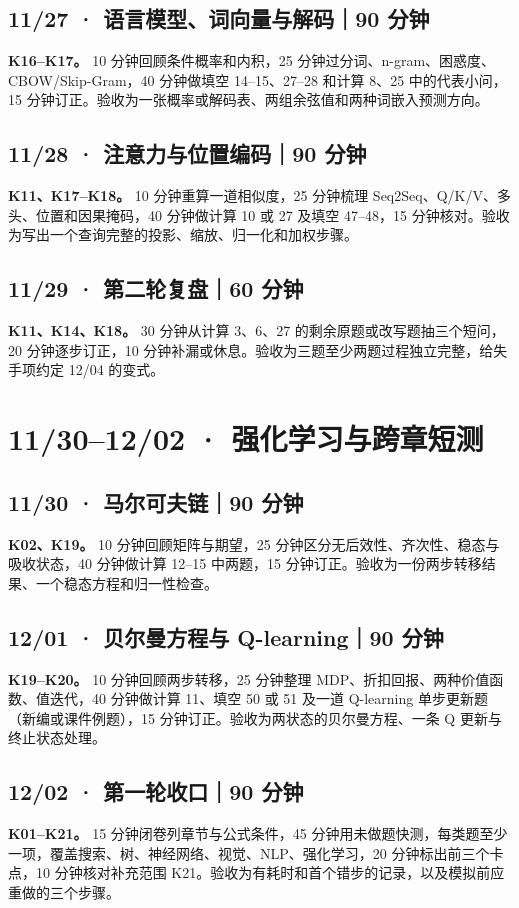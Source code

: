 \documentclass[UTF8,a4paper,11pt]{ctexart}
\begin{document}
\subsection{11/27 · 语言模型、词向量与解码｜90 分钟}
\textbf{K16–K17。} 10 分钟回顾条件概率和内积，25 分钟过分词、n-gram、困惑度、CBOW/Skip-Gram，40 分钟做填空 14–15、27–28 和计算 8、25 中的代表小问，15 分钟订正。验收为一张概率或解码表、两组余弦值和两种词嵌入预测方向。

\subsection{11/28 · 注意力与位置编码｜90 分钟}
\textbf{K11、K17–K18。} 10 分钟重算一道相似度，25 分钟梳理 Seq2Seq、Q/K/V、多头、位置和因果掩码，40 分钟做计算 10 或 27 及填空 47–48，15 分钟核对。验收为写出一个查询完整的投影、缩放、归一化和加权步骤。

\subsection{11/29 · 第二轮复盘｜60 分钟}
\textbf{K11、K14、K18。} 30 分钟从计算 3、6、27 的剩余原题或改写题抽三个短问，20 分钟逐步订正，10 分钟补漏或休息。验收为三题至少两题过程独立完整，给失手项约定 12/04 的变式。

\section{11/30–12/02 · 强化学习与跨章短测}
\subsection{11/30 · 马尔可夫链｜90 分钟}
\textbf{K02、K19。} 10 分钟回顾矩阵与期望，25 分钟区分无后效性、齐次性、稳态与吸收状态，40 分钟做计算 12–15 中两题，15 分钟订正。验收为一份两步转移结果、一个稳态方程和归一性检查。

\subsection{12/01 · 贝尔曼方程与 Q-learning｜90 分钟}
\textbf{K19–K20。} 10 分钟回顾两步转移，25 分钟整理 MDP、折扣回报、两种价值函数、值迭代，40 分钟做计算 11、填空 50 或 51 及一道 Q-learning 单步更新题（新编或课件例题），15 分钟订正。验收为两状态的贝尔曼方程、一条 Q 更新与终止状态处理。

\subsection{12/02 · 第一轮收口｜90 分钟}
\textbf{K01–K21。} 15 分钟闭卷列章节与公式条件，45 分钟用未做题快测，每类题至少一项，覆盖搜索、树、神经网络、视觉、NLP、强化学习，20 分钟标出前三个卡点，10 分钟核对补充范围 K21。验收为有耗时和首个错步的记录，以及模拟前应重做的三个步骤。
\end{document}
